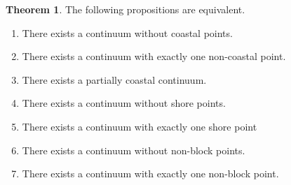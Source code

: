 \documentclass[12pt]{article}
\theoremstyle{plain}
\theoremstyle{definition}
\newcounter{dummy}
\newcounter{dummy4}
\newcounter{dummy3}
\newtheorem{thm3}[dummy3]{Theorem}
\newcounter{dummy5}
\newcounter{dummy6}
\newcommand{\0}{\ensuremath{\varnothing}}
\begin{document}
\begin{thm3}\label{equiv} The following propositions are equivalent.

\begin{enumerate}
	
	\item There exists a continuum without coastal points.
	\item There exists a continuum with exactly one non-coastal point.
	\item There exists a partially coastal continuum.
	\item There exists a continuum without shore points.
	\item There exists a continuum with exactly one shore point
	\item There exists a continuum without non-block points.
	\item There exists a continuum with exactly one non-block point.
	
	
\end{enumerate}

\end{thm3}
\end{document}

